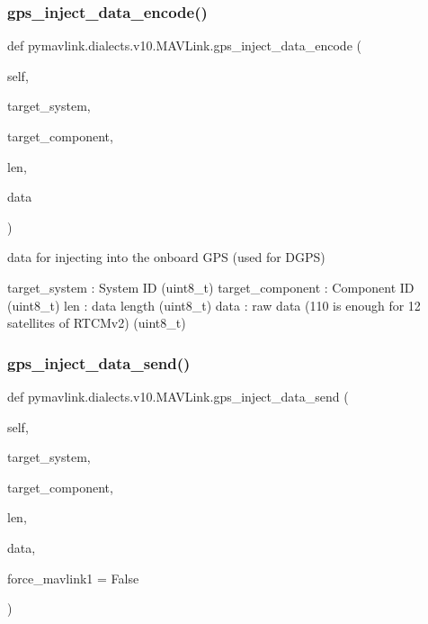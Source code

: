 \begin{DoxyVerb}
\begin{DoxyVerb}
\subsubsection{\texorpdfstring{gps\+\_\+inject\+\_\+data\+\_\+encode()}{gps\_inject\_data\_encode()}}
{\footnotesize\ttfamily def pymavlink.\+dialects.\+v10.\+M\+A\+V\+Link.\+gps\+\_\+inject\+\_\+data\+\_\+encode (\begin{DoxyParamCaption}\item[{}]{self,  }\item[{}]{target\+\_\+system,  }\item[{}]{target\+\_\+component,  }\item[{}]{len,  }\item[{}]{data }\end{DoxyParamCaption})}

\begin{DoxyVerb}data for injecting into the onboard GPS (used for DGPS)

target_system             : System ID (uint8_t)
target_component          : Component ID (uint8_t)
len                       : data length (uint8_t)
data                      : raw data (110 is enough for 12 satellites of RTCMv2) (uint8_t)\end{DoxyVerb}
 \mbox{\label{classpymavlink_1_1dialects_1_1v10_1_1MAVLink_a3f7f176cd16a16186c333b3e1a28e394}} 
\subsubsection{\texorpdfstring{gps\+\_\+inject\+\_\+data\+\_\+send()}{gps\_inject\_data\_send()}}
{\footnotesize\ttfamily def pymavlink.\+dialects.\+v10.\+M\+A\+V\+Link.\+gps\+\_\+inject\+\_\+data\+\_\+send (\begin{DoxyParamCaption}\item[{}]{self,  }\item[{}]{target\+\_\+system,  }\item[{}]{target\+\_\+component,  }\item[{}]{len,  }\item[{}]{data,  }\item[{}]{force\+\_\+mavlink1 = {\ttfamily False} }\end{DoxyParamCaption})}


\end{DoxyVerb}
\end{DoxyVerb}
